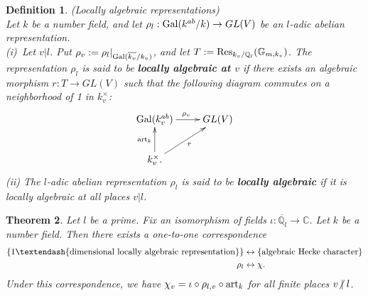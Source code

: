 \documentclass[reqno,a4paper,11pt]{amsart}
\newtheorem{dfn}{Definition}[section]
\newtheorem{thm}[dfn]{Theorem}
\theoremstyle{definition}
\theoremstyle{definition}
\newcommand{\notmid}{\mathrel{\ooalign{$\mkern-5mu\not$\crcr$|$}}}
\begin{document}
  \begin{dfn}(Locally algebraic representations)
  \\\indent Let $k$ be a number field, and let $\rho_{l} : {\rm Gal}(k^{ab}/k)\to GL(V)$ be an $l$-adic abelian representation. 
  \\\indent (i)~Let $v|l$. Put $\rho_{v} := \rho_{l}|_{{\rm Gal}(\overline{k_{v}}/k_{v})}$, and let  $T:={\rm Res}_{k_{v}/\mathbb{Q}_{l}}(\mathbb{G}_{m, k_{v}})$. The representation $\rho_{l}$ is said to be \textbf{locally algebraic at $v$} if there exists an algebraic morphism $r : T\to GL(V)$ such that the following diagram commutes on a neighborhood of 1 in $k^{\times}_{v}$:
  \[\xymatrix{{\rm Gal}(k_{v}^{ab})\ar[r]^{\rho_{v}}& GL(V) \\ k_{v}^{\times}.\ar[u]^{{\rm art}_{k}}\ar[ur]_{r}}\]
   \indent (ii) The $l$-adic abelian representation $\rho_{l}$ is said to be \textbf{locally algebraic} if it is locally algebraic at all places $v|l$.
\end{dfn}
\begin{thm}\cite[Chapter III-1-Proposition 2]{serre}\label{1gal}
    Let $l$ be a prime. Fix an isomorphism of fields $\iota : \overline{\mathbb{Q}_{l}}\to \mathbb{C}$. Let $k$ be a number field. Then there exists a one-to-one correspondence  
    \begin{align}
     \{1\textendash{\rm dimensional~ locally~algebraic~representation}\}&\leftrightarrow\{{\rm algebraic~Hecke~character}\}\notag
     \\ \rho_{l}&\leftrightarrow\chi.\notag   
    \end{align}
    Under this correspondence, we have $\chi_{v}=\iota\circ \rho_{l, v}\circ {\rm art}_{k}$ for all finite places $v\notmid l$.
\end{thm}
\end{document}
